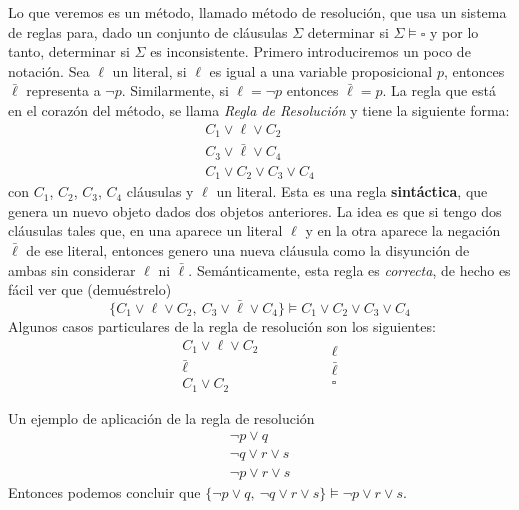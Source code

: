 Lo que veremos es un m\'etodo, llamado m\'etodo de resoluci\'on, que usa un sistema de reglas 
para, dado un conjunto de cl\'ausulas $\Sigma$ determinar si $\Sigma\models \square$ y por lo tanto, 
determinar si $\Sigma$ es inconsistente. Primero introduciremos un poco de notaci\'on.
Sea $\ell$ un literal, si $\ell$ es igual a una variable proposicional $p$, entonces $\bar{\ell}$
representa a $\neg p$. Similarmente, si $\ell=\neg p$ entonces $\bar{\ell}=p$.
La regla que est\'a en el coraz\'on del m\'etodo, se llama {\em Regla de Resoluci\'on} y 
tiene la siguiente forma:
\[
\begin{array}{c}
C_1 \vee \ell \vee C_2 \\
C_3 \vee \bar{\ell} \vee C_4 \\ \hline
C_1 \vee C_2 \vee C_3 \vee C_4 
\end{array}
\]
con $C_1$, $C_2$, $C_3$, $C_4$ cl\'ausulas y $\ell$ un literal.
Esta es una regla {\bf sint\'actica}, que genera un nuevo objeto dados dos objetos
anteriores.
La idea es que si tengo dos cl\'ausulas tales que, en una aparece un literal $\ell$ y en la otra aparece la
negaci\'on $\bar{\ell}$ de ese literal, entonces genero una nueva cl\'ausula como la disyunci\'on de ambas
sin considerar $\ell$ ni $\bar{\ell}$.
Sem\'anticamente, esta regla es {\em correcta}, de hecho es f\'acil ver que (demu\'estrelo)
\[
\{ C_1 \vee \ell \vee C_2,\ 
C_3 \vee \bar{\ell} \vee C_4\} \models 
C_1 \vee C_2 \vee C_3 \vee C_4 
\]
Algunos casos particulares de la regla de resoluci\'on son los siguientes:
\[
\begin{array}{c}
C_1 \vee \ell \vee C_2 \\
\bar{\ell} \\ \hline
C_1 \vee C_2 
\end{array}
\;\;\;\;\;\;\;\;
\;\;\;\;\;\;\;\;
\begin{array}{c}
\ell \\
\bar{\ell} \\ \hline
\square 
\end{array}
\]
\begin{ejemplo}
Un ejemplo de aplicaci\'on de la regla de resoluci\'on
\[
\begin{array}{c}
\neg p \vee q \\
\neg q \vee r \vee s \\ \hline
\neg p \vee r \vee s
\end{array}
\]
Entonces podemos concluir que $\{\neg p \vee q,\ \neg q \vee r \vee s\}\models \neg p \vee r \vee s$.
\end{ejemplo}

